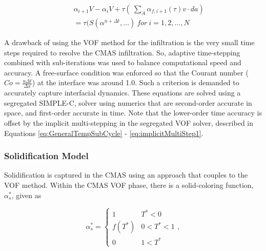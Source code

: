 \documentclass[%
 aip,
 amsmath,amssymb,
 reprint,%
]{revtex4-1}
\begin{document}
\begin{eqnarray}
\label{eq:implicitMultiStep1}
    &&\alpha_{i+1}V - \alpha_{i}V + \tau( \ \sum_{A}\alpha_{f,i+1}(\tau) v \cdot da) \nonumber \\
    &&=\tau(S(\alpha^{n+\Delta t},...) ~ for~ i = 1, 2, ..., N
\end{eqnarray}

A drawback of using the VOF method for the infiltration is the very small time steps required to resolve the CMAS infiltration. So, adaptive time-stepping combined with sub-iterations was used to balance computational speed and accuracy. A free-surface condition was enforced so that the Courant number ($Co = \frac{u \Delta t}{\Delta x}$) at the interface was around 1.0. Such a criterion is demanded to accurately capture interfacial dynamics. 
These equations are solved using a segregated SIMPLE-C, solver using numerics that are second-order accurate in space, and first-order accurate in time. Note that the lower-order time accuracy is offset by the implicit multi-stepping in the segregated VOF solver, described in Equations \ref{eq:GeneralTempSubCycle} - \ref{eq:implicitMultiStep1}.

\subsubsection{Solidification Model}
\label{sec:solidmodel}
Solidification is captured in the CMAS using an approach that couples to the VOF method. Within the CMAS VOF phase, there is a solid-coloring function, $\alpha_s^*$, given as   

\begin{equation}
    \alpha^{*}_{s} = \begin{cases}
    1 & T^{*} < 0 \\
    f(T^{*})& 0<T^{*}<1 \\
    0& 1 < T^{*}
    \end{cases},
    \label{eq:solidificationModel}
\end{equation}
\end{document}
